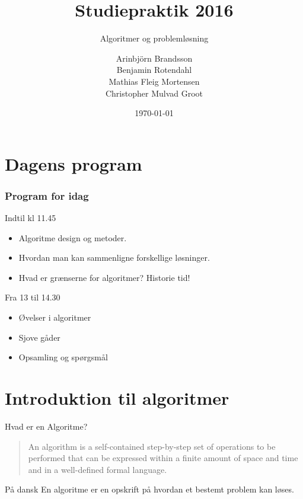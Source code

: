 \documentclass[12pt,t]{beamer}
\title{Studiepraktik 2016}
\subtitle{Algoritmer og problemløsning}
\author{
        Arinbjörn Brandsson \\
        Benjamin Rotendahl  \\
        Mathias Fleig Mortensen \\
        Christopher Mulvad Groot\\
}
\date[]{\today}
\begin{document}
\frame[plain]{\titlepage}
 \frame{\tableofcontents}

\section{Dagens program}

\begin{frame}
    \frametitle{Program for idag}
    \begin{block}{Indtil kl 11.45}
        \begin{itemize}
            \item Algoritme design og metoder. \pause
            \item Hvordan man kan sammenligne forskellige løsninger. \pause
            \item Hvad er grænserne for algoritmer? \pause \alert{Historie tid!}
        \end{itemize}
    \end{block}
    \pause
    \begin{block}{Fra 13 til 14.30}
        \begin{itemize}
            \item Øvelser i algoritmer \pause
            \item Sjove gåder \pause
            \item Opsamling og spørgsmål
        \end{itemize}
    \end{block}
\end{frame}


\section{Introduktion til algoritmer}
    \begin{frame}[c]{Hvad er en Algoritme?}
        \begin{quote}
            An algorithm is a self-contained step-by-step set of operations to
            be performed that can be expressed within a finite amount of space
            and time and in a well-defined formal language.
        \end{quote}
        \pause
        \begin{block}{På dansk}
            En algoritme er en \alert{opskrift} på hvordan et bestemt problem
            kan løses.
        \end{block}
    \end{frame}
\end{document}
